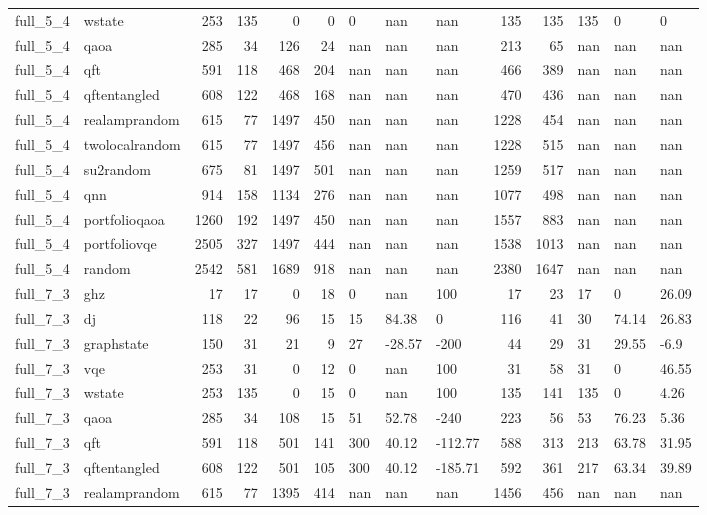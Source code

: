 \begin{longtable}{llrrrrlllrrlll}
full\_5\_4 & wstate & 253 & 135 & 0 & 0 & 0 & nan & nan & 135 & 135 & 135 & 0 & 0 \\
full\_5\_4 & qaoa & 285 & 34 & 126 & 24 & nan & nan & nan & 213 & 65 & nan & nan & nan \\
full\_5\_4 & qft & 591 & 118 & 468 & 204 & nan & nan & nan & 466 & 389 & nan & nan & nan \\
full\_5\_4 & qftentangled & 608 & 122 & 468 & 168 & nan & nan & nan & 470 & 436 & nan & nan & nan \\
full\_5\_4 & realamprandom & 615 & 77 & 1497 & 450 & nan & nan & nan & 1228 & 454 & nan & nan & nan \\
full\_5\_4 & twolocalrandom & 615 & 77 & 1497 & 456 & nan & nan & nan & 1228 & 515 & nan & nan & nan \\
full\_5\_4 & su2random & 675 & 81 & 1497 & 501 & nan & nan & nan & 1259 & 517 & nan & nan & nan \\
full\_5\_4 & qnn & 914 & 158 & 1134 & 276 & nan & nan & nan & 1077 & 498 & nan & nan & nan \\
full\_5\_4 & portfolioqaoa & 1260 & 192 & 1497 & 450 & nan & nan & nan & 1557 & 883 & nan & nan & nan \\
full\_5\_4 & portfoliovqe & 2505 & 327 & 1497 & 444 & nan & nan & nan & 1538 & 1013 & nan & nan & nan \\
full\_5\_4 & random & 2542 & 581 & 1689 & 918 & nan & nan & nan & 2380 & 1647 & nan & nan & nan \\
full\_7\_3 & ghz & 17 & 17 & 0 & 18 & 0 & nan & 100 & 17 & 23 & 17 & 0 & 26.09 \\
full\_7\_3 & dj & 118 & 22 & 96 & 15 & 15 & 84.38 & 0 & 116 & 41 & 30 & 74.14 & 26.83 \\
full\_7\_3 & graphstate & 150 & 31 & 21 & 9 & 27 & -28.57 & -200 & 44 & 29 & 31 & 29.55 & -6.9 \\
full\_7\_3 & vqe & 253 & 31 & 0 & 12 & 0 & nan & 100 & 31 & 58 & 31 & 0 & 46.55 \\
full\_7\_3 & wstate & 253 & 135 & 0 & 15 & 0 & nan & 100 & 135 & 141 & 135 & 0 & 4.26 \\
full\_7\_3 & qaoa & 285 & 34 & 108 & 15 & 51 & 52.78 & -240 & 223 & 56 & 53 & 76.23 & 5.36 \\
full\_7\_3 & qft & 591 & 118 & 501 & 141 & 300 & 40.12 & -112.77 & 588 & 313 & 213 & 63.78 & 31.95 \\
full\_7\_3 & qftentangled & 608 & 122 & 501 & 105 & 300 & 40.12 & -185.71 & 592 & 361 & 217 & 63.34 & 39.89 \\
full\_7\_3 & realamprandom & 615 & 77 & 1395 & 414 & nan & nan & nan & 1456 & 456 & nan & nan & nan \\

\end{longtable}
